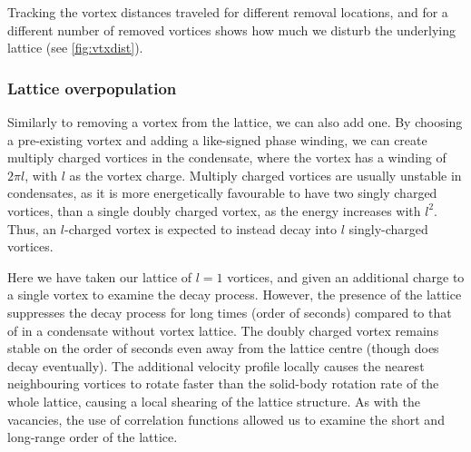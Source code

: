 \iffalse
\begin{figure}[tb]
	\texttt{[image: imgs/Disloc\_-1\_centre\_voronoi\_t100ms\_cbar]}
	\caption{Voronoi cells after removing vortex at condensate centre for t=100 ms. Vortices at edge boundary neglected. }
	\label{fig:voronoi_100ms}
\end{figure}
\fi
Tracking the vortex distances traveled for different removal locations, and for a different number of removed vortices shows how much we
disturb the underlying lattice (see \ref{fig:vtxdist}).

\iffalse
\begin{figure}[tb]
	\texttt{[image: imgs/vtx\_distance\_travelled]}
	\caption{Vortex total traveled distance with different removal positions for between 1 and 3 vortices.}
	\label{fig:vtxdist}
\end{figure}
\fi



\subsubsection{Lattice overpopulation}
Similarly to removing a vortex from the lattice, we can also add one. By choosing a pre-existing vortex and adding a like-signed phase
winding, we can create multiply charged vortices in the condensate, where the vortex has a winding of $2\pi l$, with $l$ as the vortex
charge. Multiply charged vortices are usually unstable in condensates, as it is more energetically favourable to have two singly charged
vortices, than a single doubly charged vortex, as the energy increases with $l^2$. Thus, an $l$-charged vortex is expected to instead decay
into $l$ singly-charged vortices.

Here we have taken our lattice of $l=1$ vortices, and given an additional charge to a single vortex to examine the decay process. However,
the presence of the lattice suppresses the decay process for long times (order of seconds) compared to that of in a condensate without vortex
lattice. The doubly charged vortex remains stable on the order of seconds even away from the lattice centre (though does decay eventually).
The additional velocity profile locally causes the nearest neighbouring vortices to rotate faster than the solid-body rotation rate of the
whole lattice, causing a local shearing of the lattice structure. As with the vacancies, the use of correlation functions allowed us to
examine the short and long-range order of the lattice.

